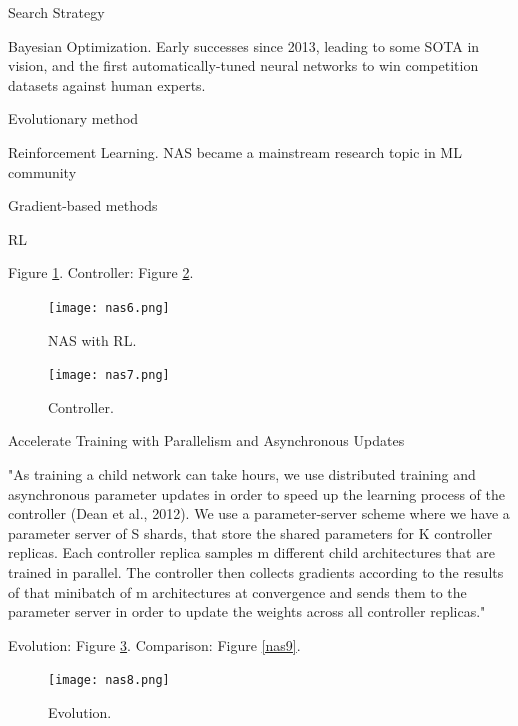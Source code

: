 \documentclass[english]{article}
\begin{document}
\item Search Strategy

\benum 
\item Bayesian Optimization.
Early successes since 2013, leading to some SOTA in vision, and the first automatically-tuned neural networks to win competition datasets against human experts. 
\item
Evolutionary method
\item 
Reinforcement Learning.
NAS became a mainstream research topic in ML community
\item Gradient-based methods
\eenum 

\eenum 

\item RL

\benum 

\item Figure \ref{nas6}. Controller: Figure \ref{nas7}.

\begin{figure}[h!]
  \centering
  \texttt{[image: nas6.png]}
  \caption{NAS with RL.}
  \label{nas6}
\end{figure}


\begin{figure}[h!]
  \centering
  \texttt{[image: nas7.png]}
  \caption{Controller.}
  \label{nas7}
\end{figure}


\item Accelerate Training with Parallelism and Asynchronous Updates

"As training a child network can take hours, we use distributed training and
asynchronous parameter updates in order to speed up the learning process of the controller (Dean
et al., 2012). We use a parameter-server scheme where we have a parameter server of S shards, that
store the shared parameters for K controller replicas. Each controller replica samples m different
child architectures that are trained in parallel. The controller then collects gradients according to the
results of that minibatch of m architectures at convergence and sends them to the parameter server
in order to update the weights across all controller replicas."



\item Evolution: Figure \ref{nas8}. Comparison: Figure \ref{nas9}.


\begin{figure}[h!]
  \centering
  \texttt{[image: nas8.png]}
  \caption{Evolution.}
  \label{nas8}
\end{figure}
\end{document}
